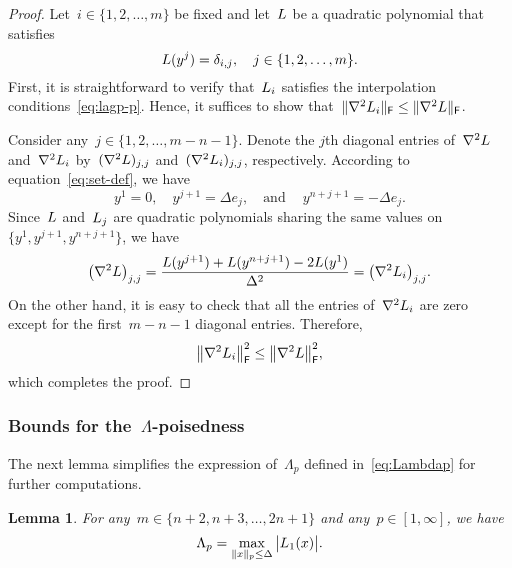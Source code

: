 \documentclass{article}
\numberwithin{equation}{section}
\theoremstyle{definition}
\theoremstyle{plain}
\newtheorem{lemma}{Lemma}[section]
\theoremstyle{remark}
\newcommand*{\abs}[2][]{#1\lvert#2#1\rvert}
\newcommand*{\lagp}[1][]{L\ifblank{#1}{}{_{#1}}}
\newcommand*{\norm}[2][]{#1\lVert#2#1\rVert}
\newcommand*{\set}[2][]{#1\{#2#1\}}
\begin{document}
\begin{proof}
    Let~$i \in \set{1, 2, \dots, m}$ be fixed and let~$\lagp$ be a quadratic polynomial that satisfies
    \begin{equation}
        \label{eq:lagp-p}
        \lagp(y^j) = \delta_{i, j}, \quad j \in \set{1, 2, \dots, m}.
    \end{equation}
    First, it is straightforward to verify that~$\lagp[i]$ satisfies the interpolation conditions~\eqref{eq:lagp-p}.
    Hence, it suffices to show that~$\|\nabla^2 \lagp[i]\|_\mathsf{F} \le \|\nabla^2 \lagp\|_\mathsf{F}$.

    Consider any~$j\in\{1,2,\dots, m-n-1\}$.
    Denote the $j$th diagonal entries of~$\nabla^2 \lagp$ and~$\nabla^2 \lagp[i]$ by~$(\nabla^2\lagp)_{j,j}$ and~$(\nabla^2\lagp[i])_{j,j}$, respectively.
    According to equation~\eqref{eq:set-def}, we have
    \begin{equation*}
        y^1 = 0, \quad y^{j + 1} = \Delta e_j, \quad \text{and} \quad~y^{n + j + 1} = -\Delta e_j.
    \end{equation*}
    Since~$\lagp$ and~$\lagp[j]$ are quadratic polynomials sharing the same values on~$\{y^1, y^{j+1},
    y^{n+j+1}\}$, we have
    \begin{equation*}
        \big(\nabla^2 \lagp \big)_{j,j}
        = \frac{\lagp(y^{j + 1}) + \lagp(y^{n + j + 1}) - 2 \lagp(y^1)}{\Delta^2}
        = \big(\nabla^2 \lagp[i] \big)_{j,j}.
    \end{equation*}
    On the other hand, it is easy to check that all the entries of~$\nabla^2 \lagp[i]$ are zero
    except for the first~$m-n-1$ diagonal entries. Therefore,
    \begin{equation*}
        \norm[\big]{\nabla^2 \lagp[i]}_{\mathsf{F}}^2 \le \norm[\big]{\nabla^2 \lagp}_{\mathsf{F}}^2,
    \end{equation*}
    which completes the proof.
\end{proof}

\subsubsection{Bounds for the~\texorpdfstring{$\Lambda$}{\textLambda}-poisedness}

The next lemma simplifies the expression of~$\Lambda_p$ defined in~\eqref{eq:Lambdap} for further computations.

\begin{lemma}
    \label{lem:lambda-p}
    For any~$m \in \set{n + 2, n + 3, \dots, 2n + 1}$ and any~$p \in [1, \infty]$, we have
    \begin{equation}
        \label{eq:lambda-p}
        \Lambda_p = \max_{\norm{x}_p \le \Delta} \abs[\big]{\lagp[1](x)}.
    \end{equation}
\end{lemma}
\end{document}
